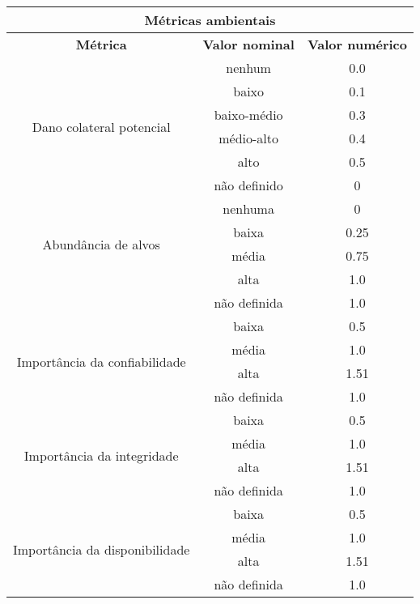 	\begin{table}
		\begin{tabular}{|c|c|c|}
			\hline
			\multicolumn{3}{|c|}{ \textbf{Métricas ambientais} } \\
			\hline
			\textbf{Métrica} & \textbf{Valor nominal} & \textbf{Valor numérico}\\
			\hline
			\multirow{6}{*}{Dano colateral potencial} & nenhum & 0.0\\
			& baixo        & 0.1 \\
			& baixo-médio  & 0.3 \\ 
			& médio-alto   & 0.4 \\
			& alto         & 0.5 \\ 
			& não definido & 0 \\ 
			\hline
			\multirow{4}{*}{Abundância de alvos} & nenhuma & 0 \\
			& baixa & 0.25\\
			& média & 0.75\\
			& alta  & 1.0\\
			& não definida  & 1.0\\
			\hline
			\multirow{4}{*}{Importância da confiabilidade} & baixa & 0.5 \\
			& média & 1.0\\
			& alta & 1.51\\
			& não definida & 1.0\\
			\hline
			\multirow{4}{*}{Importância da integridade} & baixa & 0.5 \\
			& média & 1.0\\
			& alta & 1.51\\
			& não definida & 1.0\\
			\hline
			\multirow{4}{*}{Importância da disponibilidade} & baixa & 0.5 \\
			& média & 1.0\\
			& alta & 1.51\\
			& não definida & 1.0\\
			\hline
		\end{tabular}
	\end{table}
